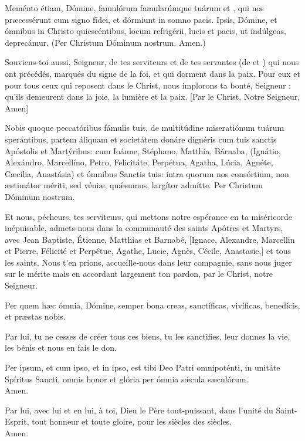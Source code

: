 \documentclass[twoside]{article}
\begin{document}
\begin{paracol}{2}
\switchcolumn*

Meménto étiam, Dómine,
famulórum famularúmque tuárum  et ,
qui nos præcessérunt cum signo fídei,
et dórmiunt in somno pacis.
Ipsis, Dómine, et ómnibus in Christo quiescéntibus,
locum refrigérii, lucis et pacis,
ut indúlgeas, deprecámur.
(Per Christum Dóminum nostrum. Amen.)

\switchcolumn

Souviens-toi aussi, Seigneur,
de tes serviteurs et de tes servantes (de  et ) qui nous ont précédés, marqués du signe de la foi, et qui dorment dans la paix. Pour eux et pour tous ceux qui reposent dans le Christ, nous implorons ta bonté, Seigneur : qu'ils demeurent dans la joie, la lumière et la paix. [Par le Christ, Notre Seigneur, Amen]

\switchcolumn*

Nobis quoque peccatóribus fámulis tuis,
de multitúdine miseratiónum tuárum sperántibus,
partem áliquam et societátem donáre dignéris
cum tuis sanctis Apóstolis et Martýribus:
cum Ioánne, Stéphano,
Matthía, Bárnaba,
(Ignátio, Alexándro,
Marcellíno, Petro,
Felicitáte, Perpétua,
Agatha, Lúcia,
Agnéte, Cæcília, Anastásia)
et ómnibus Sanctis tuis:
intra quorum nos consórtium,
non æstimátor mériti,
sed véniæ, quǽsumus, largítor admítte.
Per Christum Dóminum nostrum.

\switchcolumn

Et nous, pécheurs, tes serviteurs, qui mettons notre espérance en ta miséricorde inépuisable, admets-nous dans la communauté des saints Apôtres et Martyrs, avec Jean Baptiste, Étienne, Matthias et Barnabé, [Ignace, Alexandre, Marcellin et Pierre, Félicité et Perpétue, Agathe, Lucie, Agnès, Cécile, Anastasie,] et tous les saints. Nous t’en prions, accueille-nous dans leur compagnie,
sans nous juger sur le mérite
mais en accordant largement ton pardon,
par le Christ, notre Seigneur.

\switchcolumn*

Per quem hæc ómnia, Dómine, 
semper bona creas, sanctíficas, vivíficas, benedícis,
et præstas nobis.

\switchcolumn

Par lui, tu ne cesses de créer tous ces biens,
tu les sanctifies, leur donnes la vie, les bénis
et nous en fais le don.

\switchcolumn*

Per ipsum, et cum ipso, et in ipso,
est tibi Deo Patri omnipoténti,
in unitáte Spíritus Sancti,
omnis honor et glória
per ómnia sǽcula sæculórum.\\
\rr Amen. 

\switchcolumn

Par lui, avec lui et en lui, à toi, Dieu le Père tout-puissant, dans l'unité du Saint-Esprit, tout honneur et toute gloire, pour les siècles des siècles.\\
\rr Amen.

\end{paracol}
\end{document}
